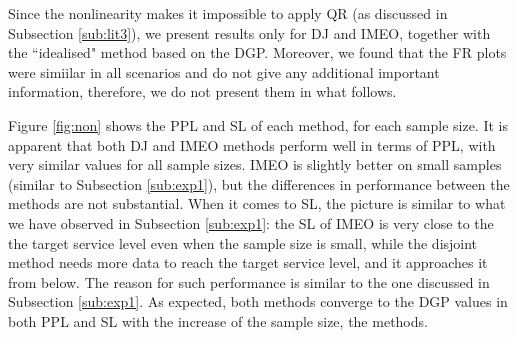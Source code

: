 \documentclass{article}
\begin{document}
Since the nonlinearity makes it impossible to apply QR (as discussed in Subsection \ref{sub:lit3}), we present results only for DJ and IMEO, together with the ``idealised" method based on the DGP. Moreover, we found that the FR plots were simiilar in all scenarios and do not give any additional important information, therefore, we do not present them in what follows.

Figure \ref{fig:non} shows the PPL and SL of each method, for each sample size. It is apparent that both DJ and IMEO methods perform well in terms of PPL, with very similar values for all sample sizes. IMEO is slightly better on small samples (similar to Subsection \ref{sub:exp1}), but the differences in performance between the methods are not substantial. When it comes to SL, the picture is similar to what we have observed in Subsection \ref{sub:exp1}: the SL of IMEO is very close to the the target service level even when the sample size is small, while the disjoint method needs more data to reach the target service level, and it approaches it from below. The reason for such performance is similar to the one discussed in Subsection \ref{sub:exp1}. As expected, both methods converge to the DGP values in both PPL and SL with the increase of the sample size, the methods.
\end{document}
